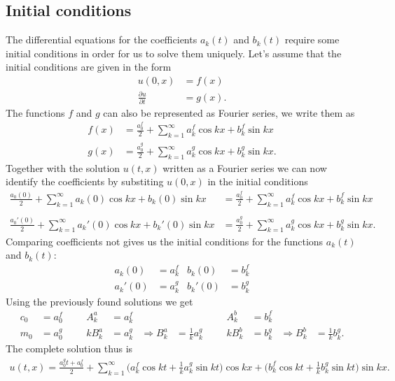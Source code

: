 \subsection{Initial conditions}
The differential equations for the coefficients $a_k(t)$ and $b_k(t)$
require some initial conditions in order for us to solve them uniquely.
Let's assume that the initial conditions are given in the form
\begin{align*}
u(0,x)&=f(x)\\
\frac{\partial u}{\partial t}&=g(x).
\end{align*}
The functions $f$ and $g$ can also be represented as Fourier series,
we write them as
\begin{align*}
f(x)&=\frac{a_0^f}2+\sum_{k=1}^\infty a_k^f\cos kx+b_k^f\sin kx\\
g(x)&=\frac{a_0^g}2+\sum_{k=1}^\infty a_k^g\cos kx+b_k^g\sin kx.
\end{align*}
Together with the solution $u(t,x)$ written as a Fourier series 
we can now identify the coefficients by substiting $u(0,x)$ in
the initial conditions
\begin{align*}
\frac{a_0(0)}2+\sum_{k=1}^\infty a_k(0)\cos kx +b_k(0)\sin kx
&=
\frac{a_0^f}2+\sum_{k=1}^\infty a_k^f\cos kx+b_k^f\sin kx\\
\\
\frac{a_0'(0)}2+\sum_{k=1}^\infty a_k'(0)\cos kx+b_k'(0)\sin kx
&=
\frac{a_0^g}2+\sum_{k=1}^\infty a_k^g\cos kx+b_k^g\sin kx.
\end{align*}
Comparing coefficients not gives us the initial conditions
for the functions $a_k(t)$ and $b_k(t)$:
\begin{align*}
a_k(0)&=a_k^f&b_k(0)&=b_k^f\\
a_k'(0)&=a_k^g&b_k'(0)&=b_k^g
\end{align*}
Using the previously found solutions we get
\begin{align*}
c_0&=a_0^f&&&A_k^a&=a_k^f&&&&&A_k^b&=b_k^f\\
m_0&=a_0^g&&&kB_k^a&=a_k^g&\Rightarrow B_k^a&=\frac1ka_k^g&&&kB_k^b&=b_k^g&\Rightarrow B_k^b&=\frac1kb_k^g.
\end{align*}
The complete solution thus is
\begin{align*}
u(t,x)=\frac{a_0^gt+a_0^f}2
+\sum_{k=1}^\infty
\biggl(a_k^f\cos kt+\frac1ka_k^g\sin kt\biggr)\cos kx
+
\biggl(b_k^f\cos kt+\frac1kb_k^g\sin kt\biggr)\sin kx.
\end{align*}


